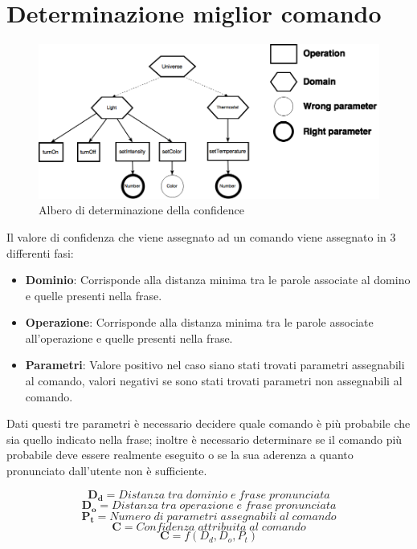 \documentclass[twoside]{supsistudent}
\begin{document}
\chapter{Determinazione miglior comando}
\begin{figure}[H]
\centering
\includegraphics[width=\textwidth]{Confidence}
\caption{Albero di determinazione della confidence}
\label{fig:pose}
\end{figure}
Il valore di confidenza che viene assegnato ad un comando viene assegnato in 3 differenti fasi:
\begin{itemize}
  \item \textbf{Dominio}: Corrisponde alla distanza minima tra le parole associate al domino e quelle presenti nella frase.
  \item \textbf{Operazione}: Corrisponde alla distanza minima tra le parole associate all'operazione e quelle presenti nella frase.
  \item \textbf{Parametri}: Valore positivo nel caso siano stati trovati parametri assegnabili al comando, valori negativi se sono stati trovati parametri non assegnabili al comando.
\end{itemize}
Dati questi tre parametri è necessario decidere quale comando è più probabile che sia quello indicato nella frase; inoltre è necessario determinare se il comando più probabile deve essere realmente eseguito o se la sua aderenza a quanto pronunciato dall'utente non è sufficiente.
\begin{center}
\[
\boldsymbol{D_{d}} = Distanza\;tra\;dominio\;e\;frase\;pronunciata
\]
\[
\boldsymbol{D_{o}} = Distanza\;tra\;operazione\;e\;frase\;pronunciata
\]
\[
\boldsymbol{P_{t}} = Numero\;di\;parametri\;assegnabili\;al\;comando
\]
\[
\boldsymbol{C} = Confidenza\;attribuita\;al\;comando
\]
\[
\boldsymbol{C} = f(D_{d} ,D_{o},P_{t})
\]
\end{center}
\end{document}

